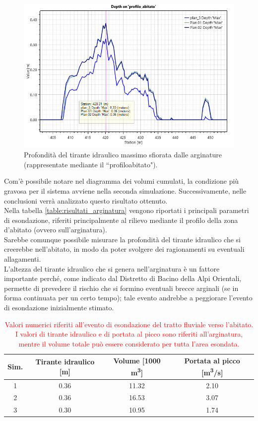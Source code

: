 \begin{figure}[H] \centering
    \includegraphics[scale=0.5]{immagini/depth_profilo_abitato.png}
    \caption{Profondità del tirante idraulico massimo sfiorata dalle arginature (rappresentate mediante il ``profilo\textunderscore abitato").}
    \label{figure:depth_profilo_abitato}
\end{figure}

Com'è possibile notare nel diagramma dei volumi cumulati, la condizione più gravosa per il sistema avviene nella seconda simulazione. Successivamente, nelle conclusioni verrà analizzato questo risultato ottenuto.\\
Nella tabella \eqref{table:risultati_arginatura} vengono riportati i principali parametri di esondazione, riferiti principalmente al rilievo mediante il profilo della zona d'abitato (ovvero sull'arginatura).\\
Sarebbe comunque possibile misurare la profondità del tirante idraulico che si creerebbe nell'abitato, in modo da poter svolgere dei ragionamenti su eventuali allagamenti.\\
L'altezza del tirante idraulico che si genera nell'arginatura è un fattore importante perché, come indicato dal Distretto di Bacino della Alpi Orientali, permette di prevedere il rischio che si formino eventuali brecce arginali (se in forma continuata per un certo tempo); tale evento andrebbe a peggiorare l'evento di esondazione inizialmente stimato.

\begin{table}[hbt]\centering
    \caption{\textcolor{red}{Valori numerici riferiti all'evento di esondazione del tratto fluviale verso l'abitato. I valori di tirante idraulico e di portata al picco sono riferiti all'arginatura, mentre il volume totale può essere considerato per tutta l'area esondata.}}
    \begin{tabular}{cccc}
    \toprule
    Sim. & Tirante idraulico [m] & Volume [1000 \unit{m^3}] & Portata al picco [\unit{m^3/s}] \\
    \midrule
    1 & 0.36 & 11.32 &   2.10\\
    2 & 0.36 & 16.53 & 3.07  \\
    3 & 0.30 & 10.95 & 1.74  \\
    \bottomrule
    \end{tabular}
    \label{table:risultati_arginatura}
    \end{table}

